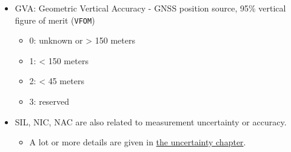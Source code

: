 \begin{itemize}

\item
  GVA: Geometric Vertical Accuracy - GNSS position source, 95\% vertical   figure of merit (\texttt{VFOM})

  \begin{itemize}

  \item
    0: unknown or \textgreater{} 150 meters
  \item
    1: \textless{} 150 meters
  \item
    2: \textless{} 45 meters
  \item
    3: reserved
  \end{itemize}
\item
  SIL, NIC, NAC are also related to measurement uncertainty or accuracy.

  \begin{itemize}

  \item
    A lot or more details are given in \href{uncertainty.html}{the
    uncertainty chapter}.
  \end{itemize}
\end{itemize}
